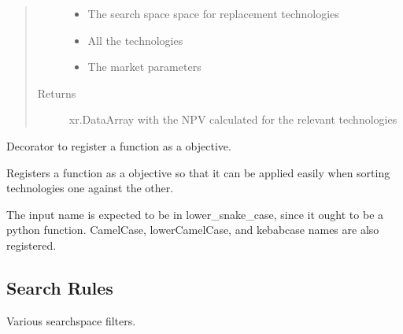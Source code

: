 \documentclass[letterpaper,10pt,english]{sphinxmanual}
\begin{document}
\begin{fulllineitems}
\begin{quote}
\begin{description}
\begin{itemize}
\item {} 
 \textendash{} The search space space for replacement technologies

\item {} 
 \textendash{} All the technologies

\item {} 
 \textendash{} The market parameters

\end{itemize}

\item[{Returns}] \leavevmode
xr.DataArray with the NPV calculated for the relevant technologies

\end{description}\end{quote}

\end{fulllineitems}


\begin{fulllineitems}
\label{\detokenize{api:muse.objectives.register_objective}}
Decorator to register a function as a objective.

Registers a function as a objective so that it can be applied easily
when sorting technologies one against the other.

The input name is expected to be in lower\_snake\_case, since it ought to be a
python function. CamelCase, lowerCamelCase, and kebab\sphinxhyphen{}case names are also
registered.

\end{fulllineitems}



\subsection{Search Rules}
\label{\detokenize{api:module-muse.filters}}\label{\detokenize{api:search-rules}}
Various search\sphinxhyphen{}space filters.
\end{document}
